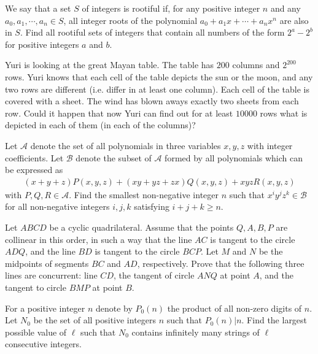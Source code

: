 \documentclass[11pt]{scrartcl}
\begin{document}
\begin{problem}[4892352754475215646]
	We say that a set $S$ of integers is rootiful if, for any positive integer $n$ and any $a_0, a_1, \cdots, a_n \in S$, all integer roots of the polynomial $a_0+a_1x+\cdots+a_nx^n$ are also in $S$. Find all rootiful sets of integers that contain all numbers of the form $2^a - 2^b$ for positive integers $a$ and $b$.
\end{problem}
\begin{problem}[825542457780626]
Yuri is looking at the great Mayan table. The table has $200$ columns and $2^{200}$ rows. Yuri knows that each cell of the table depicts the sun or the moon, and any two rows are different (i.e. differ in at least one column). Each cell of the table is covered with a sheet. The wind has blown aways exactly two sheets from each row. Could it happen that now Yuri can find out for at least $10000$ rows what is depicted in each of them (in each of the columns)?
\end{problem}
\begin{problem}[712971117639738]
Let $\mathcal{A}$ denote the set of all polynomials in three variables $x, y, z$ with integer coefficients. Let $\mathcal{B}$ denote the subset of $\mathcal{A}$ formed by all polynomials which can be expressed as
\begin{align*}
(x + y + z)P(x, y, z) + (xy + yz + zx)Q(x, y, z) + xyzR(x, y, z)
\end{align*}with $P, Q, R \in \mathcal{A}$. Find the smallest non-negative integer $n$ such that $x^i y^j z^k \in \mathcal{B}$ for all non-negative integers $i, j, k$ satisfying $i + j + k \geq n$.
\end{problem}
\begin{problem}[6193947856984766386]
Let $ABCD$ be a cyclic quadrilateral. Assume that the points $Q, A, B, P$ are collinear in this order, in such a way that the line $AC$ is tangent to the circle $ADQ$, and the line $BD$ is tangent to the circle $BCP$. Let $M$ and $N$ be the midpoints of segments $BC$ and $AD$, respectively. Prove that the following three lines are concurrent: line $CD$, the tangent of circle $ANQ$ at point $A$, and the tangent to circle $BMP$ at point $B$.
\end{problem}
\begin{problem}[504512181993018]
For a positive integer $n$ denote by $P_0(n)$ the product of all non-zero digits of $n$. Let $N_0$ be the set of all positive integers $n$ such that $P_0(n)|n$. Find the largest possible value of $\ell$ such that $N_0$ contains infinitely many strings of $\ell$ consecutive integers.
\end{problem}
\end{document}
